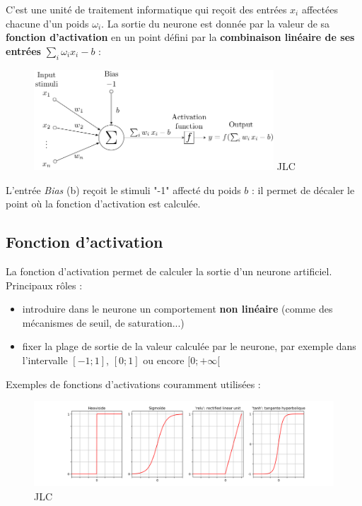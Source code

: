 \documentclass{article}
\begin{document}
C'est une unité de traitement informatique qui reçoit des entrées $x_i$ affectées chacune d'un poids $\omega_i$. 
La sortie du neurone est donnée par la valeur de sa \textbf{fonction d'activation} en un point défini par la 
\textbf{combinaison linéaire de ses entrées} $\sum_i \omega_i x_i - b$ :

\begin{figure}[H]
\centering
\includegraphics[width=0.8\textwidth]{img/nn_1.png}
JLC
\end{figure}


L'entrée \textit{Bias} (b) reçoit le stimuli "-1" affecté du poids $b$ : 
il permet de décaler le point où la fonction d'activation est calculée. 

\subsection{Fonction d'activation}

La fonction d'activation permet de calculer la sortie d'un neurone artificiel.\\

Principaux rôles :

\begin{itemize}
\item introduire dans le neurone un comportement \textbf{non linéaire} (comme des mécanismes de seuil, de saturation...)
\item fixer la plage de sortie de la valeur calculée par le neurone, par exemple dans l'intervalle $[-1 ; 1]$, $[0 ; 1]$ ou encore $[0 ; +\infty[$
\end{itemize}

Exemples de fonctions d'activations couramment utilisées :

\begin{figure}[H]
\centering
\includegraphics[width=1\textwidth]{img/activationFunctions.png}
JLC
\end{figure}
\end{document}
